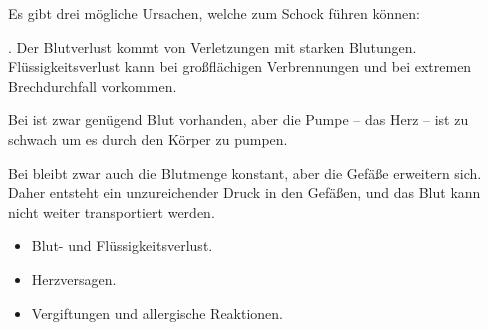 {
Es gibt drei mögliche Ursachen, welche zum Schock führen
können:

. Der Blutverlust kommt von Verletzungen mit
starken Blutungen. Flüssigkeitsverlust kann bei großflächigen Verbrennungen und
bei extremen Brechdurchfall vorkommen. 

Bei  ist zwar
genügend Blut vorhanden, aber die Pumpe -- das Herz -- ist
zu schwach um es durch den Körper zu pumpen. 

Bei  bleibt
zwar auch die Blutmenge konstant, aber die Gefäße erweitern sich. Daher
entsteht ein unzureichender Druck in den Gefäßen, und das Blut kann nicht weiter
transportiert werden. 
}{
\begin{itemize}
  \item Blut- und Flüssigkeitsverlust.
  \item Herzversagen.
  \item Vergiftungen und allergische Reaktionen.
\end{itemize}
}{}{}{}

% 
% 
% 
% 
% 
% 
% 

